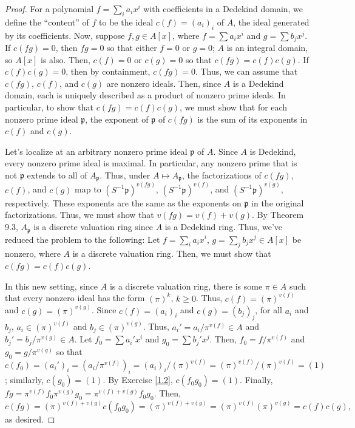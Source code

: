 \begin{proof}
For a polynomial $f = \sum_i a_i x^i$ with coefficients in a Dedekind domain, we define the ``content'' of $f$ to be the ideal $c(f) = (a_i)_i$ of $A$, the ideal generated 
by its coefficients. Now, suppose $f,g \in A[x]$, where $f = \sum a_i x^i$ and $g = \sum b_j x^j$. If $c(fg) = 0$, then $fg = 0$ so that either $f = 0$ or $g = 0$; $A$ is an
integral domain, so $A[x]$ is also. Then, 
$c(f) = 0$ or $c(g) = 0$ so that $c(fg) = c(f)c(g)$. If $c(f)c(g) = 0$, then by containment, $c(fg) = 0$. Thus, we can assume that $c(fg)$, $c(f)$, and $c(g)$ are 
nonzero ideals. Then, since $A$ is a Dedekind domain, each is uniquely described as a product of nonzero prime ideals. In particular, to show that $c(fg) = c(f)c(g)$, we must
show that for each nonzero prime ideal $\mathfrak{p}$, the exponent of $\mathfrak{p}$ of $c(fg)$ is the sum of its exponents in $c(f)$ and $c(g)$. 

Let's localize at an arbitrary nonzero prime ideal $\mathfrak{p}$ of $A$. Since $A$ is Dedekind, every nonzero prime ideal is maximal. In particular, any nonzero prime that is not
$\mathfrak{p}$ extends to all of $A_{\mathfrak{p}}$. Thus, under $A \mapsto A_{\mathfrak{p}}$, the factorizations of $c(fg)$, $c(f)$, and $c(g)$ map to
$(S^{-1}\mathfrak{p})^{v(fg)}$, $(S^{-1}\mathfrak{p})^{v(f)}$, and $(S^{-1}\mathfrak{p})^{v(g)}$, respectively. These exponents are the same as the exponents on $\mathfrak{p}$
in the original factorizations. Thus, we must show that $v(fg) = v(f) + v(g)$. By Theorem 9.3, $A_{\mathfrak{p}}$ is a discrete valuation ring since $A$ is a Dedekind ring.
Thus, we've reduced the problem to the following: Let $f = \sum_i a_i x^i$, $g = \sum_j b_j x^j \in A[x]$ be nonzero, where $A$ is a discrete valuation ring. Then, we must show 
that $c(fg) = c(f)c(g)$.

In this new setting, since $A$ is a discrete valuation ring, there is some $\pi \in A$ such that every nonzero ideal has the form $(\pi)^k$, $k \ge 0$. Thus, $c(f) = (\pi)^{v(f)}$ 
and $c(g) = (\pi)^{v(g)}$. Since $c(f) = (a_i)_i$ and $c(g) = (b_j)_j$, for all $a_i$ and $b_j$, $a_i \in (\pi)^{v(f)}$ and $b_j \in (\pi)^{v(g)}$. Thus, 
$a_i' = a_i/\pi^{v(f)} \in A$ and $b_j' = b_j/\pi^{v(g)} \in A$. Let $f_0 = \sum a_i' x^i$ and $g_0 = \sum b_j' x^j$. Then, $f_0 = f / \pi^{v(f)}$ and $g_0 = g / \pi^{v(g)}$ so that 
$c(f_0) = (a_i')_i = (a_i/\pi^{v(f)})_i = (a_i)_i/(\pi)^{v(f)} = (\pi)^{v(f)}/(\pi)^{v(f)} = (1)$; similarly, $c(g_0) = (1)$. By Exercise \ref{1.2}, $c(f_0g_0) = (1)$. Finally, 
$fg = \pi^{v(f)} f_0 \pi^{v(g)} g_0 = \pi^{v(f) + v(g)} f_0 g_0$. Then, 
$$c(fg) = (\pi)^{v(f) + v(g)}c(f_0g_0) = (\pi)^{v(f) + v(g)} = (\pi)^{v(f)}(\pi)^{v(g)} = c(f)c(g),$$
as desired.
\end{proof}

